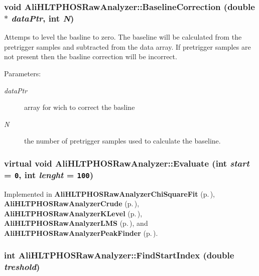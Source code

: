 \subsubsection{\setlength{\rightskip}{0pt plus 5cm}void Ali\-HLTPHOSRaw\-Analyzer::Baseline\-Correction (double $\ast$ {\em data\-Ptr}, int {\em N})}\label{classAliHLTPHOSRawAnalyzer_a5}


Attemps to level the basline to zero. The baseline will be calculated from the pretrigger samples and subtracted from the data array. If pretrigger samples are not present then the basline correction will be incorrect. \begin{Desc}
\item[Parameters:]
\begin{description}
\item[{\em data\-Ptr}]array for wich to correct the basline \item[{\em N}]the number of pretrigger samples used to calculate the baseline. \end{description}
\end{Desc}
\subsubsection{\setlength{\rightskip}{0pt plus 5cm}virtual void Ali\-HLTPHOSRaw\-Analyzer::Evaluate (int {\em start} = {\tt 0}, int {\em lenght} = {\tt 100})\hspace{0.3cm}{\tt  [pure virtual]}}\label{classAliHLTPHOSRawAnalyzer_a14}




Implemented in {\bf Ali\-HLTPHOSRaw\-Analyzer\-Chi\-Square\-Fit} {\rm (p.\,\pageref{classAliHLTPHOSRawAnalyzerChiSquareFit_a4})}, {\bf Ali\-HLTPHOSRaw\-Analyzer\-Crude} {\rm (p.\,\pageref{classAliHLTPHOSRawAnalyzerCrude_a4})}, {\bf Ali\-HLTPHOSRaw\-Analyzer\-KLevel} {\rm (p.\,\pageref{classAliHLTPHOSRawAnalyzerKLevel_a4})}, {\bf Ali\-HLTPHOSRaw\-Analyzer\-LMS} {\rm (p.\,\pageref{classAliHLTPHOSRawAnalyzerLMS_a5})}, and {\bf Ali\-HLTPHOSRaw\-Analyzer\-Peak\-Finder} {\rm (p.\,\pageref{classAliHLTPHOSRawAnalyzerPeakFinder_a6})}.
\subsubsection{\setlength{\rightskip}{0pt plus 5cm}int Ali\-HLTPHOSRaw\-Analyzer::Find\-Start\-Index (double {\em treshold})}\label{classAliHLTPHOSRawAnalyzer_a7}


